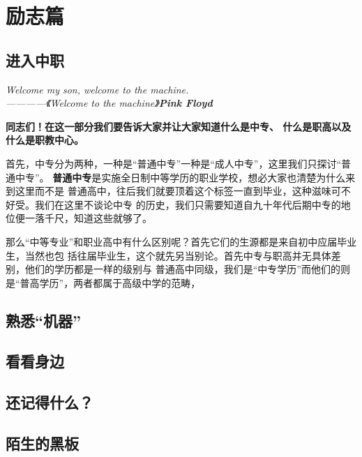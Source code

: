 \section{励志篇}

\subsection{进入中职}

\begin{center}
    \emph{Welcome my son, welcome to the machine.\\————《Welcome to the machine》\textbf{Pink Floyd}}
\end{center}

\textbf{同志们！在这一部分我们要告诉大家并让大家知道什么是中专、
什么是职高以及什么是职教中心。}

首先，中专分为两种，一种是“普通中专”一种是“成人中专”，这里我们只探讨“普通中专”。
\textbf{普通中专}是实施全日制中等学历的职业学校，想必大家也清楚为什么来到这里而不是
普通高中，往后我们就要顶着这个标签一直到毕业，这种滋味可不好受。我们在这里不谈论中专
的历史，我们只需要知道自九十年代后期中专的地位便一落千尺，知道这些就够了。

那么“中等专业”和职业高中有什么区别呢？首先它们的生源都是来自初中应届毕业生，当然也包
括往届毕业生，这个就先另当别论。首先中专与职高并无具体差别，他们的学历都是一样的级别与
普通高中同级，我们是“中专学历”而他们的则是“普高学历”，两者都属于高级中学的范畴，

\subsection{熟悉“机器”}

\subsection{看看身边}

\subsection{还记得什么？}

\subsection{陌生的黑板}


